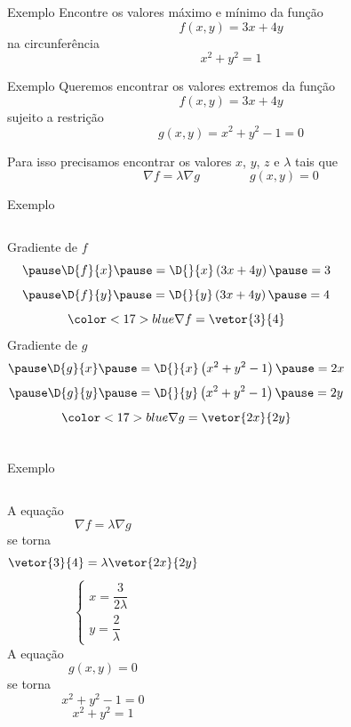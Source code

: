 \addtocounter{exemplo}{1}
\begin{frame}{Exemplo \theexemplo}
  Encontre os valores máximo e mínimo da função
  \[
    f(x, y) = 3x + 4y
  \]
  na circunferência
  \[
    x^2 + y^2 = 1
  \]
\end{frame}

\begin{frame}{Exemplo \theexemplo}
  Queremos encontrar os valores extremos da função
  \[
    f(x, y) = 3x + 4y
  \]
  \pause
  sujeito a restrição
  \[
    g(x, y) = x^2 + y^2 - 1 = 0
  \]

  \pause
  Para isso precisamos encontrar os valores $x$, $y$, $z$ e $\lambda$ tais que
  \[
    \nabla f = \lambda \nabla g
    \qquad\qquad
    g(x, y) = 0
  \]
\end{frame}

\begin{frame}{Exemplo \theexemplo}
\begin{columns}
  Gradiente de $f$
  \[
    \pause
    \D{f}{x}
    \pause
    = \D{}{x}\left(3x + 4y\right)
    \pause
    = 3
  \]
  \[
    \pause
    \D{f}{y}
    \pause
    = \D{}{y}\left(3x + 4y\right)
    \pause
    = 4
  \]
  \pause
  \[
    {\color<17>{blue}\nabla f = \vetor{3}{4}}
  \]
  \pause
  Gradiente de $g$
  \[
    \pause
    \D{g}{x}
    \pause
    = \D{}{x}\left(x^2 + y^2 - 1\right)
    \pause
    = 2x
  \]
  \[
    \pause
    \D{g}{y}
    \pause
    = \D{}{y}\left(x^2 + y^2 - 1\right)
    \pause
    = 2y
  \]
  \pause
  \[
    {\color<17>{blue}\nabla g = \vetor{2x}{2y}}
  \]
\end{columns}
\end{frame}

\begin{frame}[t]{Exemplo \theexemplo}
\begin{columns}
  A equação
  \[
    \nabla f = \lambda \nabla g
  \]
  \pause
  se torna
  \[
    \vetor{3}{4} = \lambda \vetor{2x}{2y}
  \]
  {%
    \pause
    \[
    \begin{cases}
      x = \dfrac{3}{2\lambda} \\[4mm]
      y = \dfrac{2}{\lambda}
    \end{cases}
  \]}
  \pause
  A equação
  \[
    g(x, y) = 0
  \]
  \pause
  se torna
  \[
    x^2 + y^2 - 1 = 0
  \]
  {%
    \pause
  \[
    x^2 + y^2 = 1
  \]}
\end{columns}
\end{frame}


